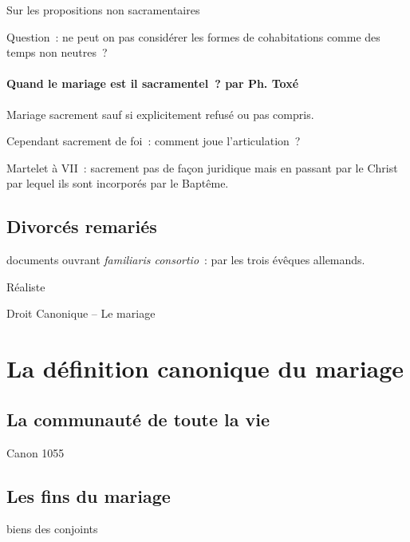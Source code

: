 Sur les propositions non sacramentaires

Question~: ne peut on pas considérer les formes de cohabitations comme
des temps non neutres~?

\hypertarget{quand-le-mariage-est-il-sacramentel-par-ph.-toxuxe9}{%
\paragraph{Quand le mariage est il sacramentel~? par Ph.
Toxé}\label{quand-le-mariage-est-il-sacramentel-par-ph.-toxuxe9}}

Mariage sacrement sauf si explicitement refusé ou pas compris.

Cependant sacrement de foi~: comment joue l'articulation~?

Martelet à VII~: sacrement pas de façon juridique mais en passant par le
Christ par lequel ils sont incorporés par le Baptême.

\hypertarget{divorcuxe9s-remariuxe9s}{%
\subsection{Divorcés remariés}\label{divorcuxe9s-remariuxe9s}}

documents ouvrant \emph{familiaris consortio}~: par les trois évêques
allemands.

Réaliste

Droit Canonique -- Le mariage

\hypertarget{la-duxe9finition-canonique-du-mariage}{%
\section{La définition canonique du
mariage}\label{la-duxe9finition-canonique-du-mariage}}

\hypertarget{la-communautuxe9-de-toute-la-vie}{%
\subsection{La communauté de toute la
vie}\label{la-communautuxe9-de-toute-la-vie}}

Canon 1055

\hypertarget{les-fins-du-mariage}{%
\subsection{Les fins du mariage}\label{les-fins-du-mariage}}

biens des conjoints

